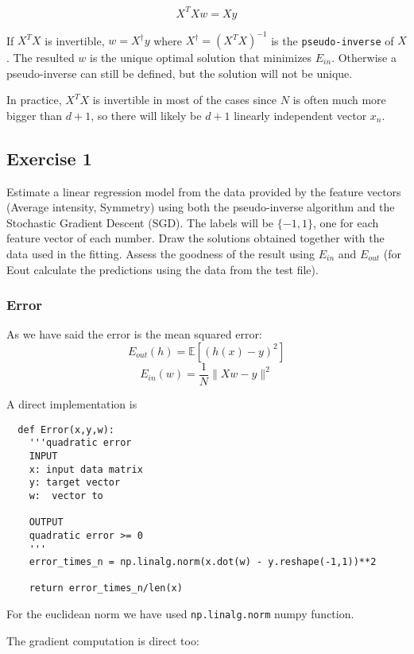 $$X^TXw = X y$$

If $X^TX$ is invertible, $w = X^\dagger y$ where $X^\dagger = (X^T X)^{-1}$ is the \texttt{pseudo-inverse} of $X$. The resulted $w$ is the unique optimal solution that minimizes $E_{in}$.  Otherwise a pseudo-inverse can still be defined, but the solution will not be unique.

In practice, $X^TX$ is invertible in most of the cases since $N$ is often much more bigger than $d+1$, so there will likely be $d+1$ linearly independent vector $x_n$.



\subsection{Exercise 1}

Estimate a linear regression model from the data provided by the
feature vectors (Average intensity, Symmetry)
using both the pseudo-inverse algorithm and the Stochastic Gradient Descent (SGD).
The labels will be $\{-1,1\}$,
one for each feature vector of each number.
Draw the solutions obtained together with the data used in the fitting.
Assess the goodness of the result using $E_{in}$ and $E_{out}$
(for Eout calculate the predictions using the data from the test file).



\subsubsection{Error}


As we have said the error is the mean squared error:
$$E_{out}(h) = \mathbb E [(h(x) -y)^2]$$
 $$E_{in}(w)  = \frac{1}{N} \| Xw -y \|^2$$

A direct implementation is

\begin{verbatim}
  def Error(x,y,w):
    '''quadratic error 
    INPUT
    x: input data matrix
    y: target vector
    w:  vector to 

    OUTPUT
    quadratic error >= 0
    '''
    error_times_n = np.linalg.norm(x.dot(w) - y.reshape(-1,1))**2
  
    return error_times_n/len(x)

  \end{verbatim}

  

  For the euclidean norm we have used \texttt{np.linalg.norm} \cite{norm} numpy function.

  The gradient computation is direct too:

